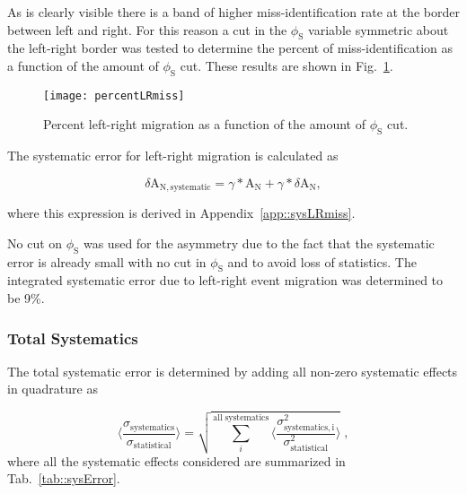 \noindent
As is clearly visible there is a band of higher miss-identification rate at the
border between left and right.  For this reason a cut in the $\phi_{\mathrm{S}}$
variable symmetric about the left-right border was tested to determine the
percent of miss-identification as a function of the amount of
$\phi_{\mathrm{S}}$ cut.  These results are shown in
Fig.~\ref{fig::percentLRmiss}.

\begin{figure}[h!t]
  \centering
  \texttt{[image: percentLRmiss]}
  \caption{Percent left-right migration as a function of the amount of
    $\phi_{\mathrm{S}}$ cut.}
    \label{fig::percentLRmiss}
\end{figure}

The systematic error for left-right migration is calculated as

\begin{equation}
  \delta \mathrm{A}_{\mathrm{N,systematic}} = \gamma *\mathrm{A}_{\mathrm{N}} +
  \gamma *\delta \mathrm{A}_{\mathrm{N}},
\end{equation}

\noindent
where this expression is derived in Appendix~\ref{app::sysLRmiss}.\par

No cut on $\phi_{\mathrm{S}}$ was used for the asymmetry due to the fact
that the systematic error is already small with no cut in $\phi_{\mathrm{S}}$
and to avoid loss of statistics.  The integrated systematic error due to
left-right event migration was determined to be 9\%.

\subsubsection{Total Systematics}
The total systematic error is determined by adding all non-zero systematic
effects in quadrature as

\begin{equation}
  \Big \langle
  \frac{
    \sigma_{\mathrm{systematics}}}{\sigma_{\mathrm{statistical}}}
  \Big \rangle =
  \sqrt{
    \sum_i^{\mathrm{all \; systematics}}
    \Big \langle
    \frac{\sigma^2_{\mathrm{systematics,
          i}}}{\sigma^2_{\mathrm{statistical}}}
    \Big \rangle
  } \;,
\end{equation}
where all the systematic effects considered are summarized in
Tab.~\ref{tab::sysError}.

